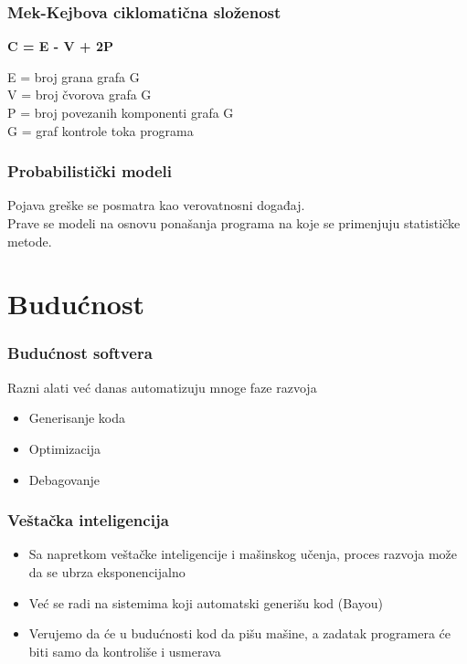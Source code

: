 \documentclass{beamer}
\begin{document}
\begin{frame}
\frametitle{Mek-Kejbova ciklomatična složenost}

\begin{center}
\textbf{C = E - V + 2P} 
\end{center}

E = broj grana grafa G \\
V = broj čvorova grafa G \\
P = broj povezanih komponenti grafa G \\
G = graf kontrole toka programa 

\end{frame}


\begin{frame}
\frametitle{Probabilistički modeli}

Pojava greške se posmatra kao verovatnosni događaj. \\
Prave se modeli na osnovu ponašanja programa na koje se primenjuju statističke metode.

\end{frame}

\section{Budućnost}
\begin{frame}
\frametitle{Budućnost softvera}

Razni alati već danas automatizuju mnoge faze razvoja
\begin{itemize}
\item Generisanje koda
\item Optimizacija
\item Debagovanje
\end{itemize}
\end{frame}

\begin{frame}
\frametitle{Veštačka inteligencija}

\begin{itemize}
\item Sa napretkom veštačke inteligencije i mašinskog učenja, proces razvoja može da se ubrza eksponencijalno
\item Već se radi na sistemima koji automatski generišu kod (Bayou)
\item Verujemo da će u budućnosti kod da pišu mašine, a zadatak programera će biti samo da kontroliše i usmerava
\end{itemize}
\end{frame}
\end{document}
